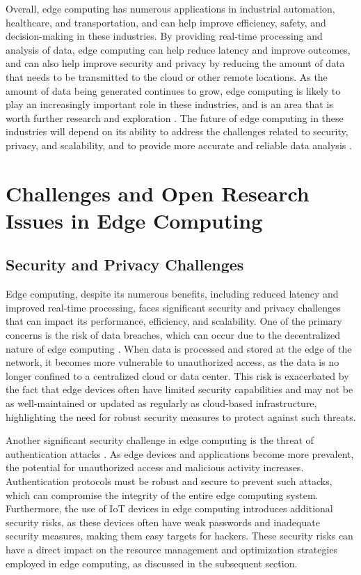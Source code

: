 \documentclass[11pt]{article}
\begin{document}
Overall, edge computing has numerous applications in industrial automation, healthcare, and transportation, and can help improve efficiency, safety, and decision-making in these industries. By providing real-time processing and analysis of data, edge computing can help reduce latency and improve outcomes, and can also help improve security and privacy by reducing the amount of data that needs to be transmitted to the cloud or other remote locations. As the amount of data being generated continues to grow, edge computing is likely to play an increasingly important role in these industries, and is an area that is worth further research and exploration \cite{ref46}. The future of edge computing in these industries will depend on its ability to address the challenges related to security, privacy, and scalability, and to provide more accurate and reliable data analysis \cite{ref47}.

\section{Challenges and Open Research Issues in Edge Computing}

\subsection{Security and Privacy Challenges}

Edge computing, despite its numerous benefits, including reduced latency and improved real-time processing, faces significant security and privacy challenges that can impact its performance, efficiency, and scalability. One of the primary concerns is the risk of data breaches, which can occur due to the decentralized nature of edge computing \cite{ref5}. When data is processed and stored at the edge of the network, it becomes more vulnerable to unauthorized access, as the data is no longer confined to a centralized cloud or data center. This risk is exacerbated by the fact that edge devices often have limited security capabilities and may not be as well-maintained or updated as regularly as cloud-based infrastructure, highlighting the need for robust security measures to protect against such threats.

Another significant security challenge in edge computing is the threat of authentication attacks \cite{ref48}. As edge devices and applications become more prevalent, the potential for unauthorized access and malicious activity increases. Authentication protocols must be robust and secure to prevent such attacks, which can compromise the integrity of the entire edge computing system. Furthermore, the use of IoT devices in edge computing introduces additional security risks, as these devices often have weak passwords and inadequate security measures, making them easy targets for hackers. These security risks can have a direct impact on the resource management and optimization strategies employed in edge computing, as discussed in the subsequent section.
\end{document}
